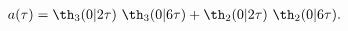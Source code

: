 \begin{equation}
  \begin{split}
  a(\tau)= \th_3(0|2\tau)~\th_3(0|6\tau)+
  \th_2(0|2\tau)~\th_2(0|6\tau).
\end{split}
\end{equation}

